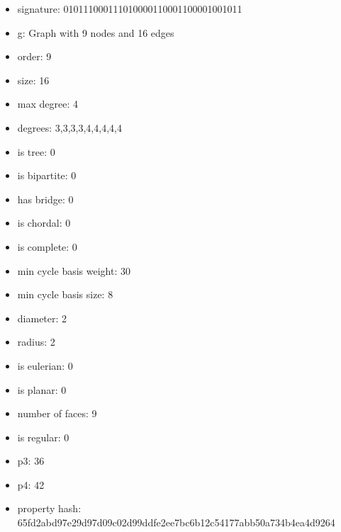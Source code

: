 \newpage
\begin{figure}
\end{figure}
\begin{itemize}
\item signature: 010111000111010000110001100001001011
\item g: Graph with 9 nodes and 16 edges
\item order: 9
\item size: 16
\item max degree: 4
\item degrees: 3,3,3,3,4,4,4,4,4
\item is tree: 0
\item is bipartite: 0
\item has bridge: 0
\item is chordal: 0
\item is complete: 0
\item min cycle basis weight: 30
\item min cycle basis size: 8
\item diameter: 2
\item radius: 2
\item is eulerian: 0
\item is planar: 0
\item number of faces: 9
\item is regular: 0
\item p3: 36
\item p4: 42
\item property hash: 65fd2abd97e29d97d09c02d99ddfe2ee7bc6b12c54177abb50a734b4ea4d9264
\end{itemize}
